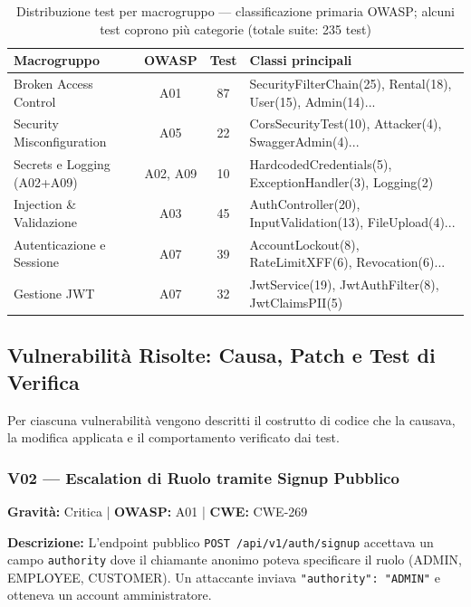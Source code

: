 \documentclass[12pt, a4paper]{article}
\begin{document}
    \begin{table}[H]
        \centering
        \small
        \begin{tabular}{|l|c|c|l|}
            \hline
            \textbf{Macrogruppo} & \textbf{OWASP} & \textbf{Test} & \textbf{Classi principali} \\
            \hline
            Broken Access Control & A01 & 87 & SecurityFilterChain(25), Rental(18), User(15), Admin(14)... \\
            Security Misconfiguration & A05 & 22 & CorsSecurityTest(10), Attacker(4), SwaggerAdmin(4)... \\
            Secrets e Logging (A02+A09) & A02, A09 & 10 & HardcodedCredentials(5), ExceptionHandler(3), Logging(2) \\
            Injection \& Validazione & A03 & 45 & AuthController(20), InputValidation(13), FileUpload(4)... \\
            Autenticazione e Sessione & A07 & 39 & AccountLockout(8), RateLimitXFF(6), Revocation(6)... \\
            Gestione JWT & A07 & 32 & JwtService(19), JwtAuthFilter(8), JwtClaimsPII(5) \\
            \hline
        \end{tabular}
        \caption{Distribuzione test per macrogruppo — classificazione primaria OWASP; alcuni test coprono più categorie (totale suite: 235 test)}
        \label{tab:test_distribution}
    \end{table}

    \subsection{Vulnerabilità Risolte: Causa, Patch e Test di Verifica}
    \label{subsec:patched_vulnerabilities}

    Per ciascuna vulnerabilità vengono descritti il costrutto di codice che la causava,
    la modifica applicata e il comportamento verificato dai test.

    \subsubsection{V02 — Escalation di Ruolo tramite Signup Pubblico}

    \textbf{Gravità:} Critica | \textbf{OWASP:} A01 | \textbf{CWE:} CWE-269

    \textbf{Descrizione:} L'endpoint pubblico \texttt{POST /api/v1/auth/signup} accettava
    un campo \texttt{authority} dove il chiamante anonimo poteva specificare il ruolo
    (ADMIN, EMPLOYEE, CUSTOMER). Un attaccante inviava \texttt{"authority": "ADMIN"}
    e otteneva un account amministratore.
\end{document}
